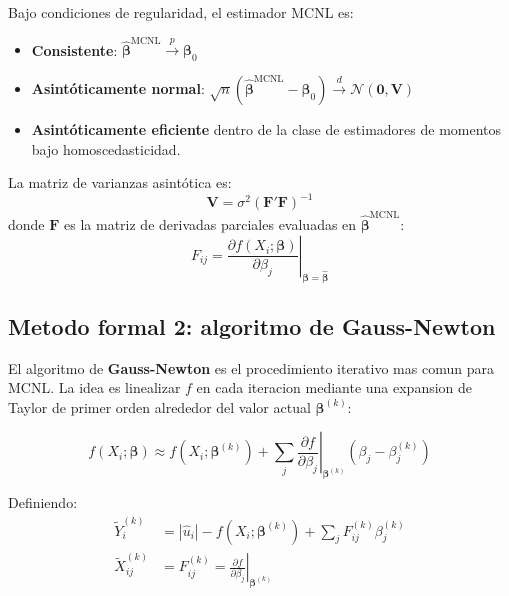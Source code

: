 \documentclass[12pt, letterpaper]{article}
\theoremstyle{remark}
\begin{document}
Bajo condiciones de regularidad, el estimador MCNL es:
\begin{itemize}[leftmargin=1.6em, itemsep=3pt]
  \item \textbf{Consistente}: $\hat{\boldsymbol\beta}^{\text{MCNL}} \xrightarrow{p} \boldsymbol\beta_0$
  \item \textbf{Asintóticamente normal}: $\sqrt{n}(\hat{\boldsymbol\beta}^{\text{MCNL}} - \boldsymbol\beta_0)
    \xrightarrow{d} \mathcal{N}(\mathbf{0}, \mathbf{V})$
  \item \textbf{Asintóticamente eficiente} dentro de la clase de estimadores
    de momentos bajo homoscedasticidad.
\end{itemize}

La matriz de varianzas asintótica es:
\begin{equation}
  \mathbf{V} = \sigma^2 \left(\mathbf{F}'\mathbf{F}\right)^{-1}
  \label{eq:var_MCNL}
\end{equation}
donde $\mathbf{F}$ es la matriz de derivadas parciales evaluadas en
$\hat{\boldsymbol\beta}^{\text{MCNL}}$:
\begin{equation}
  F_{ij} = \left.\frac{\partial f(X_i; \boldsymbol\beta)}{\partial \beta_j}\right|_{\boldsymbol\beta = \hat{\boldsymbol\beta}}
  \label{eq:F_matrix}
\end{equation}

\subsection{Metodo formal 2: algoritmo de Gauss-Newton}

El algoritmo de \textbf{Gauss-Newton} es el procedimiento iterativo mas comun
para MCNL. La idea es linealizar $f$ en cada iteracion mediante una expansion
de Taylor de primer orden alrededor del valor actual $\boldsymbol\beta^{(k)}$:

\begin{equation}
  f(X_i; \boldsymbol\beta)
    \approx f(X_i; \boldsymbol\beta^{(k)})
    + \sum_j \left.\frac{\partial f}{\partial \beta_j}\right|_{\boldsymbol\beta^{(k)}}
      (\beta_j - \beta_j^{(k)})
  \label{eq:taylor}
\end{equation}

Definiendo:
\begin{align}
  \tilde Y_i^{(k)} &= |\hat u_i| - f(X_i; \boldsymbol\beta^{(k)})
    + \sum_j F_{ij}^{(k)} \beta_j^{(k)}
  \label{eq:Ytilde}\\
  \tilde X_{ij}^{(k)} &= F_{ij}^{(k)} = \left.\frac{\partial f}{\partial \beta_j}\right|_{\boldsymbol\beta^{(k)}}
  \label{eq:Xtilde}
\end{align}
\end{document}
